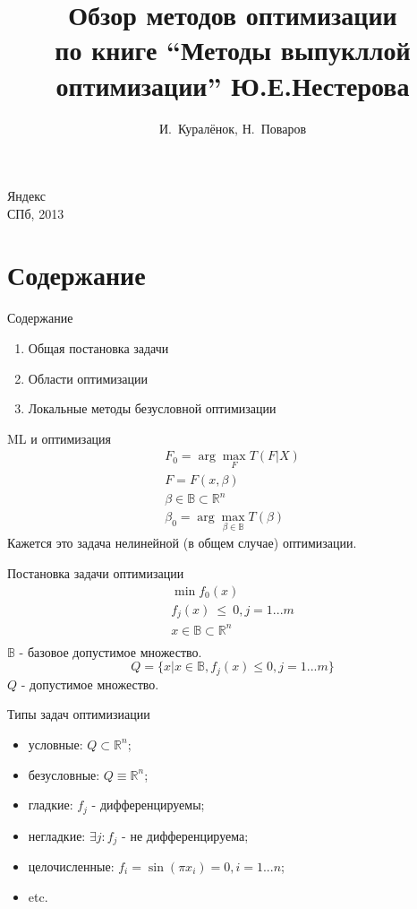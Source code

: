\documentclass[14pt, fleqn, xcolor={dvipsnames, table}]{beamer}
\title{Обзор методов оптимизации\\\small{по книге ``Методы выпукллой оптимизации'' Ю.Е.Нестерова}}
\author[]{\small{%
И.~Куралёнок,
Н.~Поваров}}
\date{}
\begin{document}
\begin{frame}
\maketitle
\small
\begin{center}
\vspace{-60pt}
\normalsize {\color{red}Я}ндекс \\
\vspace{80pt}
\footnotesize СПб, 2013
\end{center}
\end{frame}

\section{Содержание}
\begin{frame}{Содержание}
\begin{enumerate}
  \item Общая постановка задачи
  \item Области оптимизации
  \item Локальные методы безусловной оптимизации
\end{enumerate}
\end{frame}

\begin{frame}{ML и оптимизация}
  $$\begin{array}{l}
  F_0 = \arg\max_F T(F|X) \\
  F = F(x, \beta) \\
  \beta \in \mathbb{B} \subset \mathbb{R}^n \\
  \beta_0 = \arg\max_{\beta \in \mathbb{B}} T(\beta)
  \end{array}$$
\small
Кажется это задача нелинейной (в общем случае) оптимизации.
\end{frame}

\begin{frame}{Постановка задачи оптимизации}
  $$\begin{array}{l}
  \min f_0(x) \\
  f_j(x)~\le~0, j = 1...m \\
  x \in \mathbb{B} \subset \mathbb{R}^n \\
  \end{array}$$
\small
$\mathbb{B}$ - базовое допустимое множество.
$$
Q = \{x|x \in  \mathbb{B}, f_j(x) \le 0, j = 1...m\}
$$
$Q$ - допустимое множество. 
\end{frame}

\begin{frame}{Типы задач оптимизиации}
\begin{itemize}
  \item условные: $Q \subset \mathbb{R}^n$;
  \item безусловные: $Q \equiv \mathbb{R}^n$;
  \item гладкие: $f_j$ - дифференцируемы;
  \item негладкие: $\exists j: f_j$ - не дифференцируема;
  \item целочисленные: $f_i = \sin(\pi x_i) = 0, i = 1...n$;
  \item etc.
\end{itemize}
\end{frame}
\end{document}
